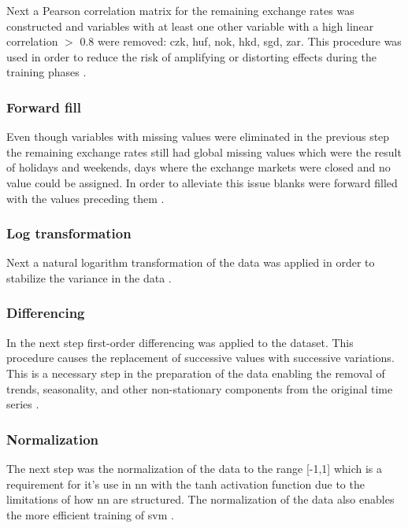 Next a Pearson correlation matrix for the remaining exchange rates was constructed and variables with at least one other variable with a high linear correlation $>$ 0.8 were removed: \gls{czk}, \gls{huf}, \gls{nok}, \gls{hkd}, \gls{sgd}, \gls{zar}. This procedure was used in order to reduce the risk of amplifying or distorting effects during the training phases \cite{genetic}.

\subsubsection{Forward fill}\label{Forward fill}

Even though variables with missing values were eliminated in the previous step the remaining exchange rates still had global missing values which were the result of holidays and weekends, days where the exchange markets were closed and no value could be assigned. In order to alleviate this issue blanks were forward filled with the values preceding them \cite{techniques,rf-svr}.

\subsubsection{Log transformation}\label{Log transformation}

Next a natural logarithm transformation of the data was applied in order to stabilize the variance in the data \cite{nn-vs-chaotic,robust-regression,gbp-usd-forecasting}.

\subsubsection{Differencing}\label{Differencing}

In the next step first-order differencing was applied to the dataset. This procedure causes the replacement of successive values with successive variations. This is a necessary step in the preparation of the data enabling the removal of trends, seasonality, and other non-stationary components from the original time series \cite{nn-vs-chaotic,robust-regression,gbp-usd-forecasting}.

\subsubsection{Normalization}\label{Normalization}

The next step was the normalization of the data to the range [-1,1] which is a requirement for it's use in \gls{nn} with the \gls{tanh} activation function due to the limitations of how \gls{nn} are structured. The normalization of the data also enables the more efficient training of \gls{svm} \cite{nn-vs-chaotic,genetic,rf-svr,ann-2}.

